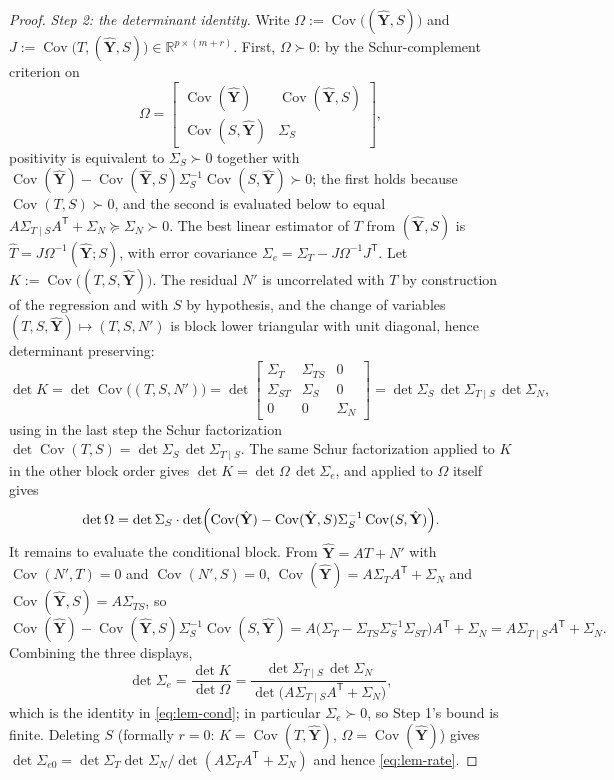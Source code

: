 \documentclass[11pt,onecolumn]{IEEEtran}
\newcommand{\R}{\mathbb{R}}
\newcommand{\Cov}{\operatorname{Cov}}
\begin{document}
\begin{proof}
\emph{Step 2: the determinant identity.} Write
$\Omega:=\Cov\bigl((\hat{\mathbf Y},S)\bigr)$ and
$J:=\Cov\bigl(T,(\hat{\mathbf Y},S)\bigr)\in\R^{p\times(m+r)}$. First,
$\Omega\succ0$: by the Schur-complement criterion on
\[
\Omega=\begin{bmatrix}
\Cov(\hat{\mathbf Y})&\Cov(\hat{\mathbf Y},S)\\[2pt]
\Cov(S,\hat{\mathbf Y})&\Sigma_S
\end{bmatrix},
\]
positivity is equivalent to $\Sigma_S\succ0$ together with
$\Cov(\hat{\mathbf Y})-\Cov(\hat{\mathbf Y},S)\Sigma_S^{-1}
\Cov(S,\hat{\mathbf Y})\succ0$; the first holds because
$\Cov(T,S)\succ0$, and the second is evaluated below to equal
$A\Sigma_{T\mid S}A^{\mathsf T}+\Sigma_N\succeq\Sigma_N\succ0$. The best
linear estimator of $T$ from $(\hat{\mathbf Y},S)$ is
$\widehat T=J\Omega^{-1}(\hat{\mathbf Y};S)$, with error covariance
$\Sigma_e=\Sigma_T-J\Omega^{-1}J^{\mathsf T}$. Let
$K:=\Cov\bigl((T,S,\hat{\mathbf Y})\bigr)$. The residual $N'$ is
uncorrelated with $T$ by construction of the regression and with $S$ by
hypothesis, and the change of variables
$(T,S,\hat{\mathbf Y})\mapsto(T,S,N')$ is block lower triangular with
unit diagonal, hence determinant preserving:
\[
\det K=\det\Cov\bigl((T,S,N')\bigr)
=\det\begin{bmatrix}
\Sigma_T&\Sigma_{TS}&0\\
\Sigma_{ST}&\Sigma_S&0\\
0&0&\Sigma_N
\end{bmatrix}
=\det\Sigma_S\,\det\Sigma_{T\mid S}\,\det\Sigma_N,
\]
using in the last step the Schur factorization
$\det\Cov(T,S)=\det\Sigma_S\,\det\Sigma_{T\mid S}$. The same Schur
factorization applied to $K$ in the other block order gives
$\det K=\det\Omega\,\det\Sigma_e$, and applied to $\Omega$ itself gives
\[
\det\Omega=\det\Sigma_S\cdot\det\Bigl(\Cov(\hat{\mathbf Y})
-\Cov(\hat{\mathbf Y},S)\Sigma_S^{-1}\Cov(S,\hat{\mathbf Y})\Bigr).
\]
It remains to evaluate the conditional block. From
$\hat{\mathbf Y}=AT+N'$ with $\Cov(N',T)=0$ and $\Cov(N',S)=0$,
$\Cov(\hat{\mathbf Y})=A\Sigma_TA^{\mathsf T}+\Sigma_N$ and
$\Cov(\hat{\mathbf Y},S)=A\Sigma_{TS}$, so
\[
\Cov(\hat{\mathbf Y})-\Cov(\hat{\mathbf Y},S)\Sigma_S^{-1}
\Cov(S,\hat{\mathbf Y})
=A\bigl(\Sigma_T-\Sigma_{TS}\Sigma_S^{-1}\Sigma_{ST}\bigr)A^{\mathsf T}
+\Sigma_N
=A\Sigma_{T\mid S}A^{\mathsf T}+\Sigma_N .
\]
Combining the three displays,
\[
\det\Sigma_e=\frac{\det K}{\det\Omega}
=\frac{\det\Sigma_{T\mid S}\,\det\Sigma_N}
{\det\bigl(A\Sigma_{T\mid S}A^{\mathsf T}+\Sigma_N\bigr)},
\]
which is the identity in \eqref{eq:lem-cond}; in particular
$\Sigma_e\succ0$, so Step 1's bound is finite. Deleting $S$ (formally
$r=0$: $K=\Cov(T,\hat{\mathbf Y})$, $\Omega=\Cov(\hat{\mathbf Y})$) gives
$\det\Sigma_{e0}=\det\Sigma_T\det\Sigma_N/
\det(A\Sigma_TA^{\mathsf T}+\Sigma_N)$ and hence \eqref{eq:lem-rate}.


\end{proof}
\end{document}

